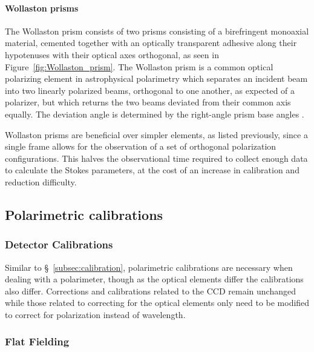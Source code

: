 \paragraph{Wollaston prisms}
The Wollaston prism consists of two prisms consisting of a birefringent monoaxial material, cemented together with an optically transparent adhesive along their hypotenuses with their optical axes orthogonal, as seen in Figure~\ref{fig:Wollaston_prism}. The Wollaston prism is a common optical polarizing element in astrophysical polarimetry which separates an incident beam into two linearly polarized beams, orthogonal to one another, as expected of a polarizer, but which returns the two beams deviated from their common axis equally. The deviation angle is determined by the right-angle prism base angles \citep{wollaston}.
\prgph

Wollaston prisms are beneficial over simpler elements, as listed previously, since a single frame allows for the observation of a set of orthogonal polarization configurations. This halves the observational time required to collect enough data to calculate the Stokes parameters, at the cost of an increase in calibration and reduction difficulty.

\subsection{Polarimetric calibrations}\label{subsec:pol_cal}

\subsubsection{Detector Calibrations}\label{subsubsec:pol_detector}

Similar to \S~\ref{subsec:calibration}, polarimetric calibrations are necessary when dealing with a polarimeter, though as the optical elements differ the calibrations also differ. Corrections and calibrations related to the \gls{CCD} remain unchanged while those related to correcting for the optical elements only need to be modified to correct for polarization instead of wavelength.
\prgph


\subsubsection{Flat Fielding}\label{subsubsec:pol_flat}

